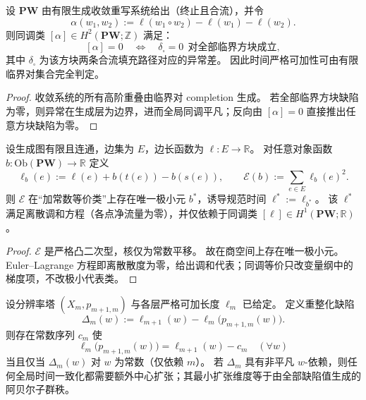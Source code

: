 \begin{theorem}\label{thm:xi-time-additivity-finite-critical-square-criterion}
设 \(\mathbf{PW}\) 由有限生成收敛重写系统给出（终止且合流），并令
\[
\alpha(w_1,w_2):=\ell(w_1\circ w_2)-\ell(w_1)-\ell(w_2).
\]
则同调类 \([\alpha]\in H^2(\mathbf{PW};\mathbb Z)\) 满足：
\[
[\alpha]=0
\quad\Longleftrightarrow\quad
\delta_{\square}=0\ \ \text{对全部临界方块成立},
\]
其中 \(\delta_{\square}\) 为该方块两条合流填充路径对应的异常差。
因此时间严格可加性可由有限临界对集合完全判定。
\end{theorem}

\begin{proof}
收敛系统的所有高阶重叠由临界对 completion 生成。
若全部临界方块缺陷为零，则异常在生成层为边界，进而全局同调平凡；反向由 \([\alpha]=0\) 直接推出任意方块缺陷为零。
\end{proof}

\begin{theorem}\label{thm:xi-canonical-time-gauge-harmonic-representative}
设生成图有限且连通，边集为 \(E\)，边长函数为 \(\ell:E\to\mathbb R\)。
对任意对象函数 \(b:\mathrm{Ob}(\mathbf{PW})\to\mathbb R\) 定义
\[
\ell_b(e):=\ell(e)+b(t(e))-b(s(e)),
\qquad
\mathcal E(b):=\sum_{e\in E}\ell_b(e)^2.
\]
则 \(\mathcal E\) 在“加常数等价类”上存在唯一极小元 \(b^\ast\)，诱导规范时间
\(
\ell^\ast:=\ell_{b^\ast}
\)。
该 \(\ell^\ast\) 满足离散调和方程（各点净流量为零），并仅依赖于同调类 \([\ell]\in H^1(\mathbf{PW};\mathbb R)\)。
\end{theorem}

\begin{proof}
\(\mathcal E\) 是严格凸二次型，核仅为常数平移。
故在商空间上存在唯一极小元。
Euler--Lagrange 方程即离散散度为零，给出调和代表；同调等价只改变量纲中的梯度项，不改极小代表类。
\end{proof}

\begin{theorem}\label{thm:xi-cross-resolution-time-renormalization-defect}
设分辨率塔 \((X_m,p_{m+1,m})\) 与各层严格可加长度 \(\ell_m\) 已给定。
定义重整化缺陷
\[
\Delta_m(w):=\ell_{m+1}(w)-\ell_m\!\bigl(p_{m+1,m}(w)\bigr).
\]
则存在常数序列 \(c_m\) 使
\[
\ell_m\!\bigl(p_{m+1,m}(w)\bigr)=\ell_{m+1}(w)-c_m\quad(\forall w)
\]
当且仅当 \(\Delta_m(w)\) 对 \(w\) 为常数（仅依赖 \(m\)）。
若 \(\Delta_m\) 具有非平凡 \(w\)-依赖，则任何全局时间一致化都需要额外中心扩张；其最小扩张维度等于由全部缺陷值生成的阿贝尔子群秩。
\end{theorem}

